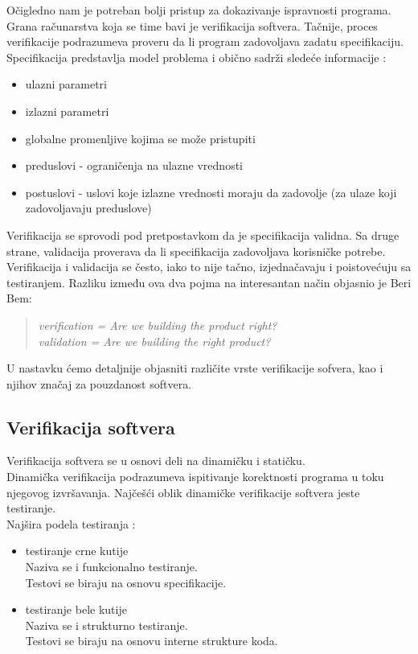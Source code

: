 \documentclass[a4paper]{article}
\begin{document}
Očigledno nam je potreban bolji pristup za dokazivanje ispravnosti programa.
Grana računarstva koja se time bavi je verifikacija softvera.
Tačnije, proces verifikacije podrazumeva proveru da li program zadovoljava zadatu specifikaciju. Specifikacija predstavlja model problema i obično sadrži sledeće informacije \cite{laski2009software}:
\begin{itemize}
\item ulazni parametri
\item izlazni parametri
\item globalne promenljive kojima se može pristupiti
\item preduslovi - ograničenja na ulazne vrednosti
\item postuslovi - uslovi koje izlazne vrednosti moraju da zadovolje (za ulaze koji zadovoljavaju preduslove)
\end{itemize}
Verifikacija se sprovodi pod pretpostavkom da je specifikacija validna.
Sa druge strane, validacija proverava da li specifikacija zadovoljava korisničke potrebe.
Verifikacija i validacija se često, iako to nije tačno, izjednačavaju i poistovećuju sa testiranjem.
Razliku između ova dva pojma na interesantan način objasnio je Beri Bem:
\begin{quote}
\emph{verification = Are we building the product right? \\
validation = Are we building the right product?}
\end{quote}

U nastavku ćemo detaljnije objasniti različite vrste verifikacije sofvera, kao i njihov značaj za pouzdanost softvera.

\subsection{Verifikacija softvera}
\label{subsec:verifikacija}
Verifikacija softvera se u osnovi deli na dinamičku i statičku.\\
Dinamička verifikacija podrazumeva ispitivanje korektnosti programa u toku njegovog izvršavanja.
Najčešći oblik dinamičke verifikacije softvera jeste testiranje.\\
Najšira podela testiranja \cite{laski2009software}:
\begin{itemize}
\item testiranje crne kutije\\
Naziva se i funkcionalno testiranje.\\
Testovi se biraju na osnovu specifikacije.
\item testiranje bele kutije\\
Naziva se i strukturno testiranje.\\
Testovi se biraju na osnovu interne strukture koda.
\end{itemize}
\end{document}
